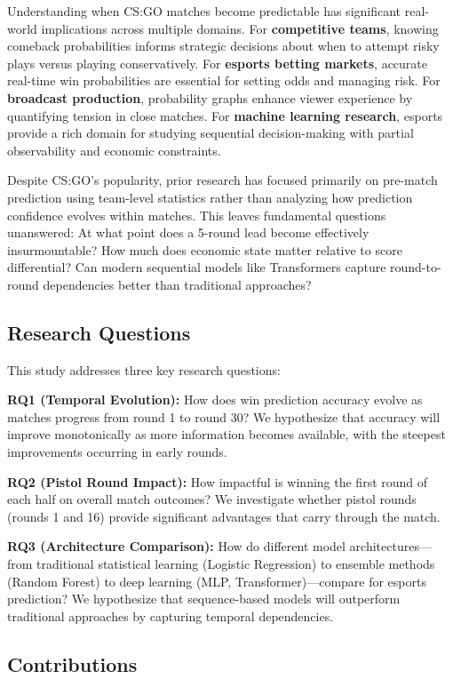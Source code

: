 \documentclass[10pt,twocolumn]{article}
\begin{document}
Understanding when CS:GO matches become predictable has significant real-world implications across multiple domains. For \textbf{competitive teams}, knowing comeback probabilities informs strategic decisions about when to attempt risky plays versus playing conservatively. For \textbf{esports betting markets}, accurate real-time win probabilities are essential for setting odds and managing risk. For \textbf{broadcast production}, probability graphs enhance viewer experience by quantifying tension in close matches. For \textbf{machine learning research}, esports provide a rich domain for studying sequential decision-making with partial observability and economic constraints.

Despite CS:GO's popularity, prior research has focused primarily on pre-match prediction using team-level statistics rather than analyzing how prediction confidence evolves within matches. This leaves fundamental questions unanswered: At what point does a 5-round lead become effectively insurmountable? How much does economic state matter relative to score differential? Can modern sequential models like Transformers capture round-to-round dependencies better than traditional approaches?

\subsection{Research Questions}

This study addresses three key research questions:

\textbf{RQ1 (Temporal Evolution):} How does win prediction accuracy evolve as matches progress from round 1 to round 30? We hypothesize that accuracy will improve monotonically as more information becomes available, with the steepest improvements occurring in early rounds.

\textbf{RQ2 (Pistol Round Impact):} How impactful is winning the first round of each half on overall match outcomes? We investigate whether pistol rounds (rounds 1 and 16) provide significant advantages that carry through the match.

\textbf{RQ3 (Architecture Comparison):} How do different model architectures—from traditional statistical learning (Logistic Regression) to ensemble methods (Random Forest) to deep learning (MLP, Transformer)—compare for esports prediction? We hypothesize that sequence-based models will outperform traditional approaches by capturing temporal dependencies.

\subsection{Contributions}
\end{document}
